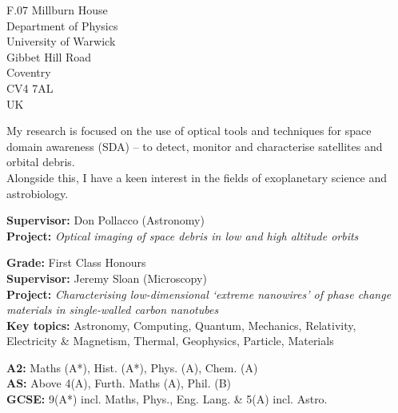 
\begin{flushright}
\vspace{-1em}
\small F.07 Millburn House \\
Department of Physics \\
University of Warwick \\
Gibbet Hill Road \\
Coventry \\
CV4 7AL \\
UK
\end{flushright}

\medskip


\small My research is focused on the use of optical tools and techniques for space domain awareness (SDA) -- to detect, monitor and characterise satellites and orbital debris. \\
Alongside this, I have a keen interest in the fields of exoplanetary science and astrobiology.

\medskip


\vspace{-1em}
\small \justify \textbf{Supervisor:} Don Pollacco (Astronomy) \\
\textbf{Project:} \textit{Optical imaging of space debris in low and high altitude orbits}

\divider

\small \textbf{Grade:} First Class Honours \\
\textbf{Supervisor:} Jeremy Sloan (Microscopy) \\
\textbf{Project:} \textit{Characterising low-dimensional `extreme nanowires' of phase change materials in single-walled carbon nanotubes} \\
\textbf{Key topics:} Astronomy, Computing, Quantum, Mechanics, Relativity, Electricity \& Magnetism, Thermal, Geophysics, Particle, Materials

\divider

\small \textbf{A2:} Maths (A*), Hist. (A*), Phys. (A), Chem. (A) \\
\textbf{AS:} Above 4(A), Furth. Maths (A), Phil. (B) \\
\textbf{GCSE:} 9(A*) incl. Maths, Phys., Eng. Lang. \& 5(A) incl. Astro.
